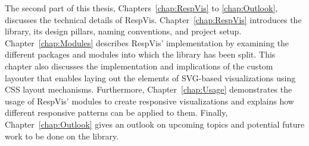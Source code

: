 The second part of this thesis, Chapters~\ref{chap:RespVis} to
\ref{chap:Outlook}, discusses the technical details of RespVis.
Chapter~\ref{chap:RespVis} introduces the library, its design pillars,
naming conventions, and project setup.  Chapter~\ref{chap:Modules}
describes RespVis' implementation by examining the different packages
and modules into which the library has been split.  This chapter also
discusses the implementation and implications of the custom layouter
that enables laying out the elements of SVG-based visualizations using
CSS layout mechanisms.  Furthermore, Chapter~\ref{chap:Usage}
demonstrates the usage of RespVis' modules to create responsive
visualizations and explains how different responsive patterns can be
applied to them.  Finally, Chapter~\ref{chap:Outlook} gives an outlook
on upcoming topics and potential future work to be done on the
library.

